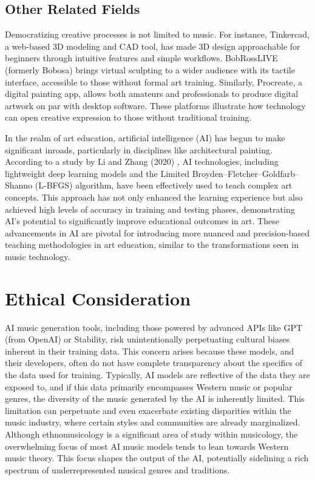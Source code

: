 \documentclass[10pt,twocolumn]{article}
\begin{document}
\subsection{Other Related Fields}
Democratizing creative processes is not limited to music. For instance, Tinkercad, a web-based 3D modeling and CAD tool, has made 3D design approachable for beginners through intuitive features and simple workflows. BobRossLIVE (formerly Bobosa) brings virtual sculpting to a wider audience with its tactile interface, accessible to those without formal art training. Similarly, Procreate, a digital painting app, allows both amateurs and professionals to produce digital artwork on par with desktop software. These platforms illustrate how technology can open creative expression to those without traditional training.

In the realm of art education, artificial intelligence (AI) has begun to make significant inroads, particularly in disciplines like architectural painting. According to a study by Li and Zhang (2020) \cite{li_application_2022}, AI technologies, including lightweight deep learning models and the Limited Broyden–Fletcher–Goldfarb–Shanno (L-BFGS) algorithm, have been effectively used to teach complex art concepts. This approach has not only enhanced the learning experience but also achieved high levels of accuracy in training and testing phases, demonstrating AI’s potential to significantly improve educational outcomes in art. These advancements in AI are pivotal for introducing more nuanced and precision-based teaching methodologies in art education, similar to the transformations seen in music technology.

\section{Ethical Consideration}
AI music generation tools, including those powered by advanced APIs like GPT (from OpenAI) or Stability, risk unintentionally perpetuating cultural biases inherent in their training data. This concern arises because these models, and their developers, often do not have complete transparency about the specifics of the data used for training. Typically, AI models are reflective of the data they are exposed to, and if this data primarily encompasses Western music or popular genres, the diversity of the music generated by the AI is inherently limited. This limitation can perpetuate and even exacerbate existing disparities within the music industry, where certain styles and communities are already marginalized. Although ethnomusicology is a significant area of study within musicology, the overwhelming focus of most AI music models tends to lean towards Western music theory. This focus shapes the output of the AI, potentially sidelining a rich spectrum of underrepresented musical genres and traditions.
\end{document}

